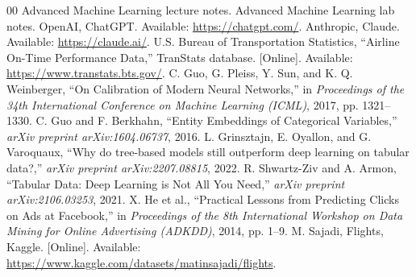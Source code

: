 \documentclass[conference]{IEEEtran}
\begin{document}
\begin{thebibliography}{00}
 Advanced Machine Learning lecture notes.
 Advanced Machine Learning lab notes.
 OpenAI, ChatGPT. Available: \url{https://chatgpt.com/}.
 Anthropic, Claude. Available: \url{https://claude.ai/}.
 U.S. Bureau of Transportation Statistics, ``Airline On-Time Performance Data,'' TranStats database. [Online]. Available: \url{https://www.transtats.bts.gov/}.
 C. Guo, G. Pleiss, Y. Sun, and K. Q. Weinberger, ``On Calibration of Modern Neural Networks,'' in \emph{Proceedings of the 34th International Conference on Machine Learning (ICML)}, 2017, pp. 1321--1330.
 C. Guo and F. Berkhahn, ``Entity Embeddings of Categorical Variables,'' \emph{arXiv preprint arXiv:1604.06737}, 2016.
 L. Grinsztajn, E. Oyallon, and G. Varoquaux, ``Why do tree-based models still outperform deep learning on tabular data?,'' \emph{arXiv preprint arXiv:2207.08815}, 2022.
 R. Shwartz-Ziv and A. Armon, ``Tabular Data: Deep Learning is Not All You Need,'' \emph{arXiv preprint arXiv:2106.03253}, 2021.
 X. He et al., ``Practical Lessons from Predicting Clicks on Ads at Facebook,'' in \emph{Proceedings of the 8th International Workshop on Data Mining for Online Advertising (ADKDD)}, 2014, pp. 1--9.
 M. Sajadi, Flights, Kaggle. [Online]. Available: \url{https://www.kaggle.com/datasets/matinsajadi/flights}.
\end{thebibliography}
\end{document}
